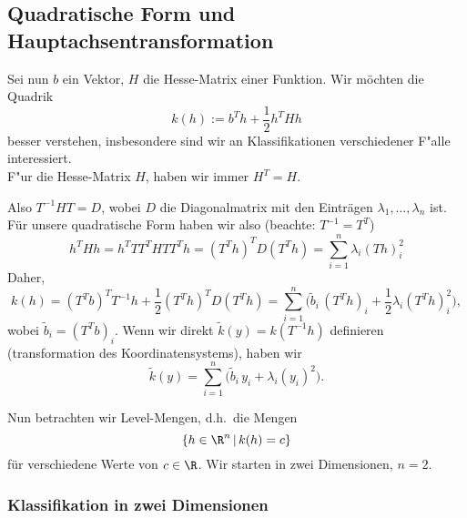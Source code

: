 \begin{auf}\cha\label{block1A6b}

\end{auf}


\subsection{Quadratische Form und Hauptachsentransformation}

Sei nun $b$ ein Vektor, $H$ die Hesse-Matrix einer Funktion. 
Wir m\"ochten die Quadrik 
$$ k(h) := b^T h + \frac 1 2 h^T H h$$
besser verstehen, insbesondere sind wir an Klassifikationen 
verschiedener F"alle interessiert. \\
F"ur die Hesse-Matrix $H$, haben wir immer $H^T=H$.\\
\par\medskip
Also $T^{-1} H T=D$, wobei $D$ die Diagonalmatrix mit den Eintr\"agen 
$\lambda_1,\ldots,\lambda_n$ ist. F\"ur unsere quadratische Form 
haben wir also (beachte: $T^{-1} = T^T$)
$$ h^T H h = h^T T T^T H T T^T h = (T^{T} h)^{T} D (T^{T}h)
= \sum_{i=1}^n \lambda_i(Th)_i^2$$
Daher, 
$$ k(h) = (T^Tb)^TT^{-1}h + \frac 1 2 (T^{T} h)^{T} D (T^{T}h) 
= \sum_{i=1}^n \bigg(\tilde b_i\, (T^{T}h)_i + \frac 1  2 \lambda_i(T^{T}h)_i^2\bigg),$$
wobei $\tilde b_i=(T^Tb)_i$. Wenn wir direkt $\tilde k(y) = k(T^{-1} h)$ 
definieren (transformation des Koordinatensystems), haben wir 
$$ \tilde k(y) = \sum_{i=1}^n \bigg(\tilde b_i\, y_i + \lambda_i(y_i)^2\bigg).$$
\par\medskip

Nun betrachten wir Level-Mengen, d.h.\ die Mengen
$$ \{ h\in\R^n\,|\, k(h)=c\}$$
f\"ur verschiedene Werte von $c\in\R$. Wir starten in zwei Dimensionen, $n=2$. 

\subsubsection{Klassifikation in zwei Dimensionen}

